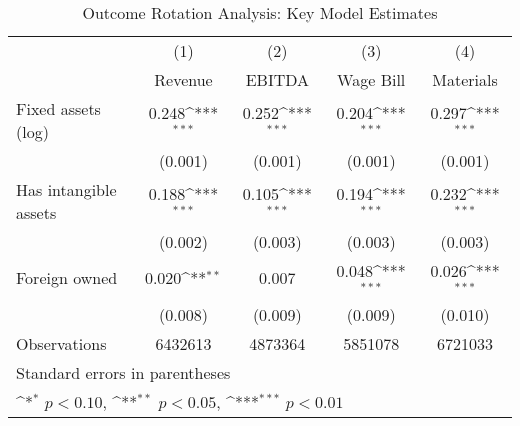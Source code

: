 \begin{table}[htbp]\centering
\def\sym#1{\ifmmode^{#1}\else\(^{#1}\)\fi}
\caption{Outcome Rotation Analysis: Key Model Estimates}
\begin{tabular}{l*{4}{c}}
\toprule
                    &\multicolumn{1}{c}{(1)}&\multicolumn{1}{c}{(2)}&\multicolumn{1}{c}{(3)}&\multicolumn{1}{c}{(4)}\\
                    &\multicolumn{1}{c}{Revenue}&\multicolumn{1}{c}{EBITDA}&\multicolumn{1}{c}{Wage Bill}&\multicolumn{1}{c}{Materials}\\
\midrule
Fixed assets (log)  &       0.248\sym{***}&       0.252\sym{***}&       0.204\sym{***}&       0.297\sym{***}\\
                    &     (0.001)         &     (0.001)         &     (0.001)         &     (0.001)         \\
\addlinespace
Has intangible assets&       0.188\sym{***}&       0.105\sym{***}&       0.194\sym{***}&       0.232\sym{***}\\
                    &     (0.002)         &     (0.003)         &     (0.003)         &     (0.003)         \\
\addlinespace
Foreign owned       &       0.020\sym{**} &       0.007         &       0.048\sym{***}&       0.026\sym{***}\\
                    &     (0.008)         &     (0.009)         &     (0.009)         &     (0.010)         \\
\midrule
Observations        &     6432613         &     4873364         &     5851078         &     6721033         \\
\bottomrule
\multicolumn{5}{l}{\footnotesize Standard errors in parentheses}\\
\multicolumn{5}{l}{\footnotesize \sym{*} \(p<0.10\), \sym{**} \(p<0.05\), \sym{***} \(p<0.01\)}\\
\end{tabular}
\end{table}
